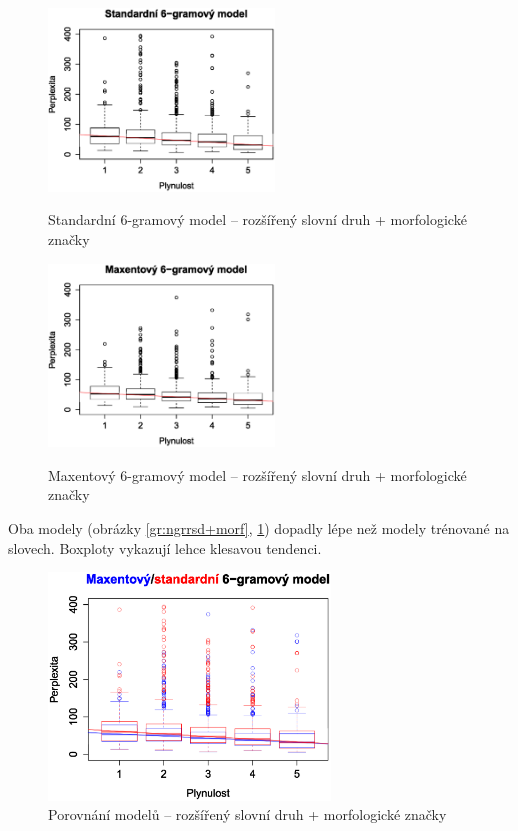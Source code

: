 \documentclass[12pt,a4paper]{report}
\begin{document}
\begin{figure}[!htb]
\begin{center}
  \centering\includegraphics[width=60mm]{./grafy/morf/ngram/all.svg.eps}	
  \caption[Standardní 6-gramový model -- rozšířený slovní druh + morf. zn.]{Standardní 6-gramový model -- rozšířený slovní druh + morfologické značky}\label{gr:ngrrsd+morf}
\endminipage\quad
{}
  \centering\includegraphics[width=60mm]{./grafy/morf/maxent/all.svg.eps}	
  \caption[Maxentový 6-gramový model -- rozšířený slovní druh + morf. zn.]{Maxentový 6-gramový model -- rozšířený slovní druh + morfologické značky}\label{gr:maxrsd+morf}
\endminipage
\end{center}
\end{figure}

Oba modely (obrázky \ref{gr:ngrrsd+morf}, \ref{gr:maxrsd+morf}) dopadly lépe než modely trénované na slovech. Box\-ploty vykazují lehce klesavou tendenci.


\begin{figure}[!htbp]
\begin{center}
	\centering
	\includegraphics[width=75mm]{./grafy/morf/porovnani/all.svg.eps}	
	\caption{Porovnání modelů -- rozšířený slovní druh + morfologické značky}\label{gr:porrsd+morf}
\endminipage
\end{center}
\end{figure}
\end{document}
